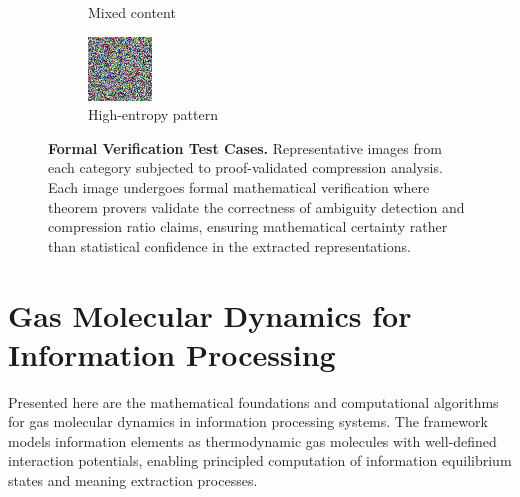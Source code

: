 \documentclass[11pt,a4paper]{article}
\begin{document}
\begin{figure}[htbp]
\begin{subfigure}{0.45\textwidth}
\caption{Mixed content}
\end{subfigure}
\hfill
\begin{subfigure}{0.45\textwidth}
\includegraphics[width=\textwidth]{images/test_image_high_entropy.png}
\caption{High-entropy pattern}
\end{subfigure}
\caption{\textbf{Formal Verification Test Cases.} Representative images from each category subjected to proof-validated compression analysis. Each image undergoes formal mathematical verification where theorem provers validate the correctness of ambiguity detection and compression ratio claims, ensuring mathematical certainty rather than statistical confidence in the extracted representations.}
\label{fig:proof-validation-cases}
\end{figure}


\section{Gas Molecular Dynamics for Information Processing}
\label{sec:gas-molecular-dynamics}

Presented here are the mathematical foundations and computational algorithms for gas molecular dynamics in information processing systems. The framework models information elements as thermodynamic gas molecules with well-defined interaction potentials, enabling principled computation of information equilibrium states and meaning extraction processes.
\end{document}
